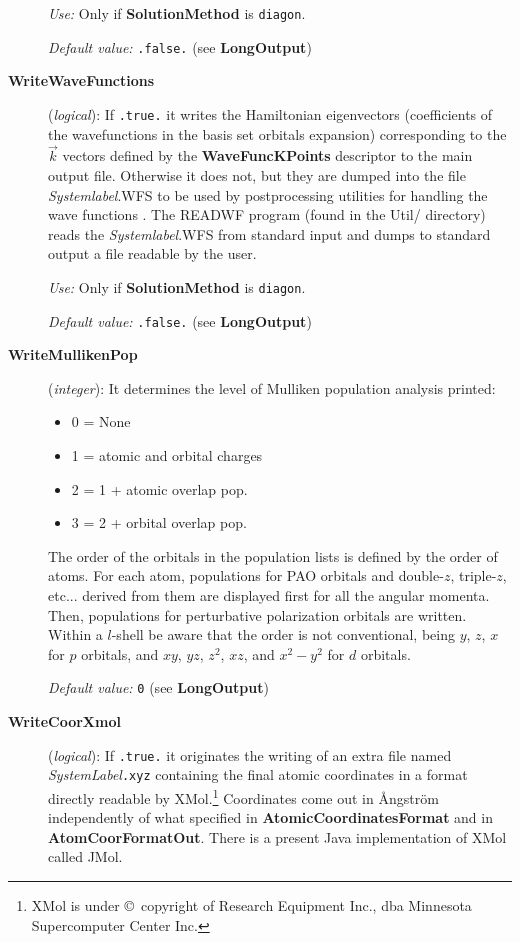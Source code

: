 \documentclass[11pt]{article}
\begin{document}
\begin{description}
{\it Use:} Only if {\bf SolutionMethod} is {\tt diagon}.
 
{\it Default value:} {\tt .false.} (see {\bf LongOutput})

\item[{\bf WriteWaveFunctions}] ({\it logical}): 
 If {\tt .true.} it writes
the Hamiltonian eigenvectors (coefficients of the wavefunctions
in the basis set orbitals expansion) corresponding to the $\vec k$ vectors
defined by the {\bf WaveFuncKPoints}
descriptor to the main output file.  Otherwise it does
not, but they are dumped into the file {\it Systemlabel}.WFS
to be used by postprocessing utilities for handling the 
wave functions
. The READWF program
(found in the Util/ directory) reads the {\it Systemlabel}.WFS from
standard input and dumps to standard output a file readable
by the user.

{\it Use:} Only if {\bf SolutionMethod} is {\tt diagon}.
 
{\it Default value:} {\tt .false.} (see {\bf LongOutput})


\item[{\bf WriteMullikenPop}] ({\it integer}): 
It determines the level of Mulliken population analysis printed:
\begin{itemize}
\item 0 = None
\item 1 = atomic and orbital charges
\item 2 = 1 + atomic overlap pop.
\item 3 = 2 + orbital overlap pop.
\end{itemize}
The order of the orbitals in the population lists is defined
by the order of atoms. For each atom, populations for PAO orbitals and
double-$z$, triple-$z$, etc... derived from them are displayed first for 
all the angular momenta. Then, populations for perturbative polarization
orbitals are written.
Within a $l$-shell be aware that the order is not
conventional, being $y$, $z$, $x$ for $p$ orbitals, and
$xy$, $yz$, $z^2$, $xz$, and $x^2-y^2$ for $d$ orbitals. 

{\it Default value:} {\tt 0} (see {\bf LongOutput})


\item[{\bf WriteCoorXmol}] ({\it logical}): 
If {\tt .true.} it originates the writing of an extra file
named {\it SystemLabel}{\tt .xyz} containing the final atomic
coordinates in a format directly readable by {\sc XMol}.\footnote{XMol
is under \copyright\ copyright of Research Equipment Inc., dba Minnesota
Supercomputer Center Inc.} Coordinates come out in {\AA}ngstr\"om
independently of what specified in {\bf AtomicCoordinatesFormat} and
in {\bf AtomCoorFormatOut}. There is a present {\sc Java} implementation 
of {\sc XMol} called {\sc JMol}.


\end{description}
\end{document}
